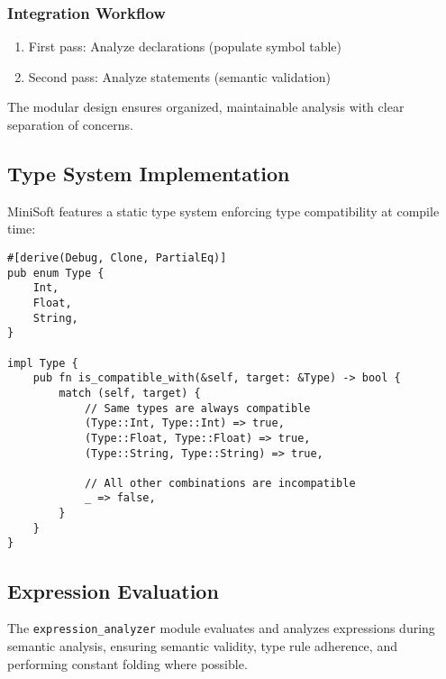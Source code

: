 \documentclass[12pt,a4paper]{article}
\begin{document}
\subsubsection{Integration Workflow}

\begin{enumerate}
	\item First pass: Analyze declarations (populate symbol table)
	\item Second pass: Analyze statements (semantic validation)
\end{enumerate}

The modular design ensures organized, maintainable analysis with clear separation of concerns.

\subsection{Type System Implementation}
MiniSoft features a static type system enforcing type compatibility at compile time:

\begin{lstlisting}[caption={Type System}]
#[derive(Debug, Clone, PartialEq)]
pub enum Type {
    Int,
    Float,
    String,
}

impl Type {
    pub fn is_compatible_with(&self, target: &Type) -> bool {
        match (self, target) {
            // Same types are always compatible
            (Type::Int, Type::Int) => true,
            (Type::Float, Type::Float) => true,
            (Type::String, Type::String) => true,
            
            // All other combinations are incompatible
            _ => false,
        }
    }
}
\end{lstlisting}

\subsection{Expression Evaluation}
The \texttt{expression\_analyzer} module evaluates and analyzes expressions during semantic analysis, ensuring semantic validity, type rule adherence, and performing constant folding where possible.
\end{document}
